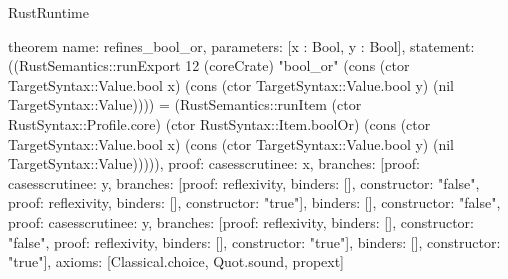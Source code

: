 \begin{lexlean}{RustRuntime}
\begin{semanticmodule}
theorem{
  name: refines_bool_or,
  parameters: [x : Bool, y : Bool],
  statement: ((RustSemantics::runExport 12 (coreCrate) "bool_or" (cons (ctor TargetSyntax::Value.bool x) (cons (ctor TargetSyntax::Value.bool y) (nil TargetSyntax::Value)))) = (RustSemantics::runItem (ctor RustSyntax::Profile.core) (ctor RustSyntax::Item.boolOr) (cons (ctor TargetSyntax::Value.bool x) (cons (ctor TargetSyntax::Value.bool y) (nil TargetSyntax::Value))))),
  proof: cases{scrutinee: x, branches: [{proof: cases{scrutinee: y, branches: [{proof: reflexivity{}, binders: [], constructor: "false"}, {proof: reflexivity{}, binders: [], constructor: "true"}]}, binders: [], constructor: "false"}, {proof: cases{scrutinee: y, branches: [{proof: reflexivity{}, binders: [], constructor: "false"}, {proof: reflexivity{}, binders: [], constructor: "true"}]}, binders: [], constructor: "true"}]},
  axioms: [Classical.choice, Quot.sound, propext]
}


\end{semanticmodule}
\end{lexlean}
